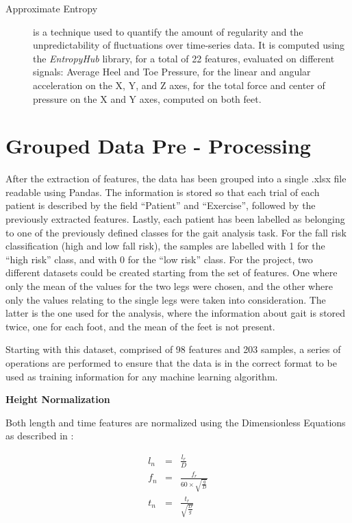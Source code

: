 \begin{description}
\item[Approximate Entropy]  is a technique used to quantify the amount of regularity and the unpredictability of fluctuations over time-series data. It is computed using the \textit{EntropyHub} library, for a total of 22 features, evaluated on different signals:
Average Heel and Toe Pressure, for the linear and angular acceleration on the X, Y, and Z axes, for the total force and center of pressure on the X and Y axes, computed on both feet.
 
\end{description}


\section{Grouped Data Pre - Processing}
After the extraction of features, the data has been grouped into a single .xlsx file readable using Pandas. The information is stored
so that each trial of each patient is described by the field \enquote{Patient} and \enquote{Exercise}, followed by the previously extracted features.
Lastly, each patient has been labelled as belonging to one of the previously defined classes for the gait analysis task. For the fall risk classification (high and low fall risk), the samples are labelled with 1 for the \enquote{high risk} class, and with 0 for the \enquote{low risk} class.
For the project, two different datasets could be created starting from the set of features. One where only the mean of the values for the two legs were chosen, and the other where only the values relating to the single legs were taken into consideration. The latter is the one used for the analysis, where the information about gait is stored twice, one for each foot, and the mean of the feet is not present.

Starting with this dataset, comprised of 98 features and 203 samples, a series of operations are performed to ensure that the data is in the correct format to be used as training information
for any machine learning algorithm. 


\textbf{Height Normalization}

Both length and time features are normalized using the Dimensionless Equations as described in \cite{HeightNormalization}:

\begin{eqnarray} 
l_n &=& \frac{{l_r }}{D} \\ f_n &=& \frac{{f_r }}{{60 \times \sqrt {\frac{g}{D}} }} \\ t_n &=& \frac{{t_r }}{{\sqrt {\frac{D}{g}} }} 
\end{eqnarray}

